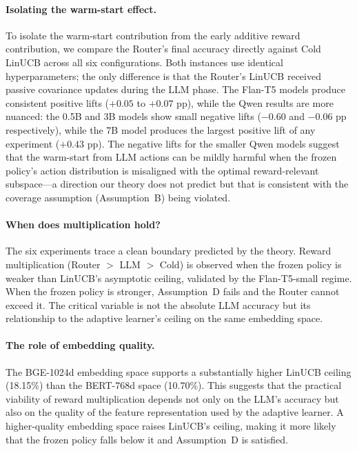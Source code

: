 \paragraph{Isolating the warm-start effect.}
To isolate the warm-start contribution from the early additive reward contribution, we compare the Router's final accuracy directly against Cold LinUCB across all six configurations. Both instances use identical hyperparameters; the only difference is that the Router's LinUCB received passive covariance updates during the LLM phase. The Flan-T5 models produce consistent positive lifts ($+0.05$ to $+0.07$ pp), while the Qwen results are more nuanced: the 0.5B and 3B models show small negative lifts ($-0.60$ and $-0.06$ pp respectively), while the 7B model produces the largest positive lift of any experiment ($+0.43$ pp). The negative lifts for the smaller Qwen models suggest that the warm-start from LLM actions can be mildly harmful when the frozen policy's action distribution is misaligned with the optimal reward-relevant subspace---a direction our theory does not predict but that is consistent with the coverage assumption (Assumption~B) being violated.

\paragraph{When does multiplication hold?}
The six experiments trace a clean boundary predicted by the theory. Reward multiplication (Router $>$ LLM $>$ Cold) is observed when the frozen policy is weaker than LinUCB's asymptotic ceiling, validated by the Flan-T5-small regime. When the frozen policy is stronger, Assumption~D fails and the Router cannot exceed it. The critical variable is not the absolute LLM accuracy but its relationship to the adaptive learner's ceiling on the same embedding space.

\paragraph{The role of embedding quality.}
The BGE-1024d embedding space supports a substantially higher LinUCB ceiling (18.15\%) than the BERT-768d space (10.70\%). This suggests that the practical viability of reward multiplication depends not only on the LLM's accuracy but also on the quality of the feature representation used by the adaptive learner. A higher-quality embedding space raises LinUCB's ceiling, making it more likely that the frozen policy falls below it and Assumption~D is satisfied.

